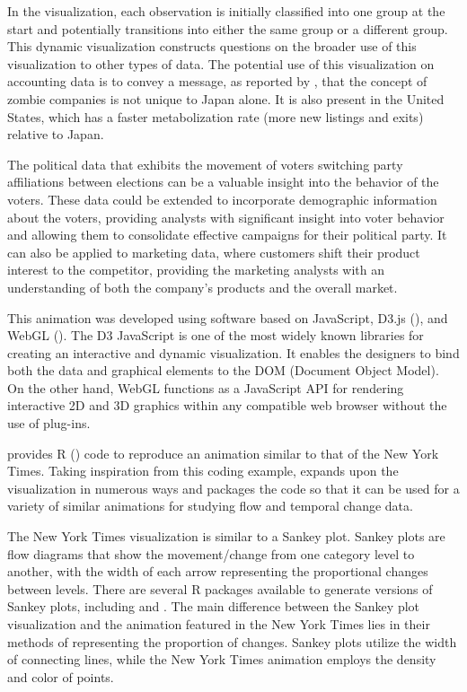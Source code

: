 In the visualization, each observation is initially classified into one group at the start and potentially transitions into either the same group or a different group. This dynamic visualization constructs questions on the broader use of this visualization to other types of data. The potential use of this visualization on accounting data is to convey a message, as reported by \citet{oecd_report}, that the concept of zombie companies is not unique to Japan alone. It is also present in the United States, which has a faster metabolization rate (more new listings and exits) relative to Japan.

The political data that exhibits the movement of voters switching party affiliations between elections can be a valuable insight into the behavior of the voters. These data could be extended to incorporate demographic information about the voters, providing analysts with significant insight into voter behavior and allowing them to consolidate effective campaigns for their political party. It can also be applied to marketing data, where customers shift their product interest to the competitor, providing the marketing analysts with an understanding of both the company's products and the overall market.

This animation was developed using software based on JavaScript, D3.js (\citet{d3js}), and WebGL (\citet{webgl}). The D3 JavaScript is one of the most widely known libraries for creating an interactive and dynamic visualization. It enables the designers to bind both the data and graphical elements to the DOM (Document Object Model). On the other hand, WebGL functions as a JavaScript API for rendering interactive 2D and 3D graphics within any compatible web browser without the use of plug-ins.

\citet{Hvitfeldt_2018} provides R (\citet{r}) code to reproduce an animation similar to that of the New York Times. Taking inspiration from this coding example,  expands upon the visualization in numerous ways and packages the code so that it can be used for a variety of similar animations for studying flow and temporal change data.

The New York Times visualization is similar to a Sankey plot. Sankey plots are flow diagrams that show the movement/change from one category level to another, with the width of each arrow representing the proportional changes between levels. There are several R packages available to generate versions of Sankey plots, including  and . The main difference between the Sankey plot visualization and the animation featured in the New York Times lies in their methods of representing the proportion of changes. Sankey plots utilize the width of connecting lines, while the New York Times animation employs the density and color of points.

